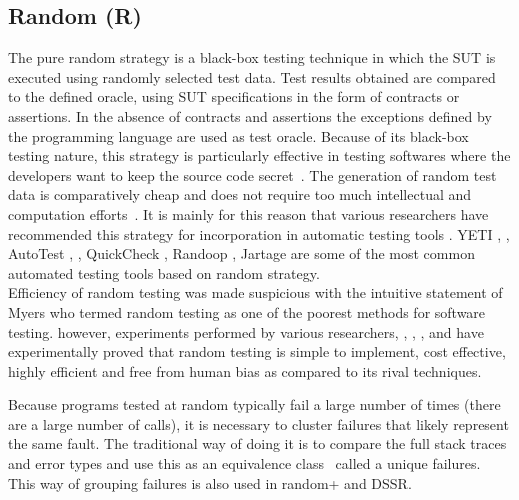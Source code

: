 \documentclass[conference]{IEEEtran}
\begin{document}
\subsection{Random (R)}
The pure random strategy is a black-box testing technique in which the SUT is executed using randomly selected test data. Test results obtained are compared to the defined oracle, using SUT specifications in the form of contracts or assertions. In the absence of contracts and assertions the exceptions defined by the programming language are used as test oracle. 
Because of its black-box testing nature, this strategy is particularly effective in testing softwares where the developers want to keep the source code secret~\cite{Chen2010}. The generation of random test data is comparatively cheap and does not require too much intellectual and computation efforts~\cite{Ciupa2009, Ciupa2008}. It is mainly for this reason that various researchers have recommended this strategy for incorporation in automatic testing tools \cite{Ciupa2008a}. YETI \cite{Oriol2010a}, \cite{Oriol2010}, AutoTest \cite{Leitner2007}, \cite{Ciupa2007}, QuickCheck \cite{Claessen2000}, Randoop \cite{Pacheco2007}, Jartage \cite{Oriat2004} are some of the most common automated testing tools based on random strategy.\\
\indent Efficiency of random testing was made suspicious with the intuitive statement of Myers \cite{Myers2004} who termed random testing as one of the poorest methods for software testing. however, experiments performed by various researchers, \cite{Ciupa2007}, \cite{Duran1981}, \cite{Duran1984}, \cite{Hamlet1994} and \cite{Ntafos2001} have experimentally proved that random testing is simple to implement, cost effective, highly efficient and free from human bias as compared to its rival techniques.\

Because programs tested at random typically fail a large number of times (there are a large number of calls), it is necessary to cluster failures that likely represent the same fault. The traditional way of doing it is to compare the full stack traces and error types and use this as an equivalence class~\cite{Ciupa2007,Oriol2012} called a unique failures. This way of grouping failures is also used in random+ and DSSR.
\end{document}
